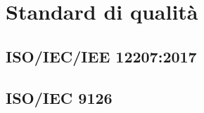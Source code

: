 \appendix
\section{Standard di qualità}
	\subsection{ISO/IEC/IEE 12207:2017}

	\pagebreak
	\subsection{ISO/IEC 9126}
	